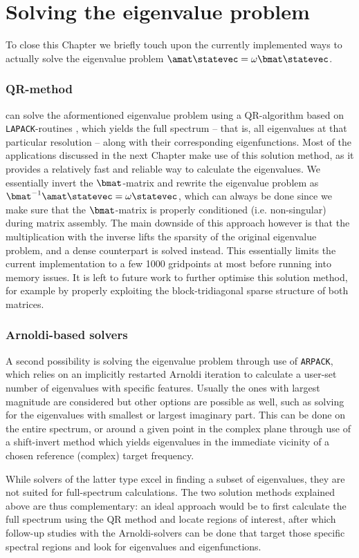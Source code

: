 \section{Solving the eigenvalue problem}
To close this Chapter we briefly touch upon the currently implemented ways to actually solve the eigenvalue problem $\amat \statevec = \omega \bmat \statevec$.

\subsubsection{QR-method}
{\legolas} can solve the aformentioned eigenvalue problem using a QR-algorithm based on \texttt{LAPACK}-routines \citep{book_lapack}, which yields the full spectrum -- that is, all eigenvalues at that particular resolution -- along with their corresponding eigenfunctions. Most of the applications discussed in the next Chapter make use of this solution method, as it provides a relatively fast and reliable way to calculate the eigenvalues. We essentially invert the $\bmat$-matrix and rewrite the eigenvalue problem as $\bmat^{-1}\amat \statevec = \omega \statevec$, which can always be done since we make sure that the $\bmat$-matrix is properly conditioned (i.e. non-singular) during matrix assembly. The main downside of this approach however is that the multiplication with the inverse lifts the sparsity of the original eigenvalue problem, and a dense counterpart is solved instead. This essentially limits the current implementation to a few 1000 gridpoints at most before running into memory issues. It is left to future work to further optimise this solution method, for example by properly exploiting the block-tridiagonal sparse structure of both matrices.

\subsubsection{Arnoldi-based solvers}
A second possibility is solving the eigenvalue problem through use of \texttt{ARPACK}, which relies on an implicitly restarted Arnoldi iteration \citep{book_arpack} to calculate a user-set number of eigenvalues with specific features. Usually the ones with largest magnitude are considered but other options are possible as well, such as solving for the eigenvalues with smallest or largest imaginary part. This can be done on the entire spectrum, or around a given point in the complex plane through use of a shift-invert method which yields eigenvalues in the immediate vicinity of a chosen reference (complex) target frequency.

While solvers of the latter type excel in finding a subset of eigenvalues, they are not suited for full-spectrum calculations. The two solution methods explained above are thus complementary: an ideal approach would be to first calculate the full spectrum using the QR method and locate regions of interest, after which follow-up studies with the Arnoldi-solvers can be done that target those specific spectral regions and look for eigenvalues and eigenfunctions.


\cleardoublepage
